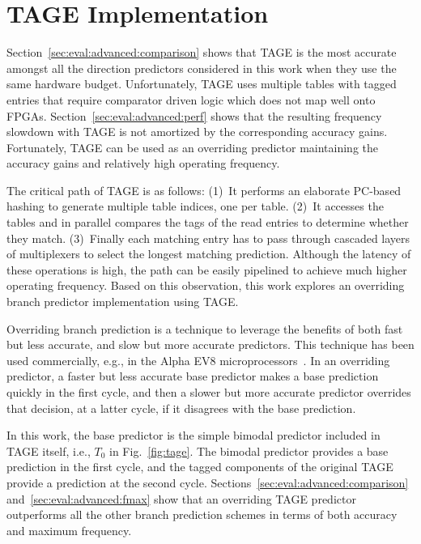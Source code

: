 \section{TAGE Implementation}
\label{sec:advanced:tage}
Section~\ref{sec:eval:advanced:comparison} shows that TAGE  is the most accurate amongst all the direction predictors considered in this work when they use the same hardware budget. Unfortunately, TAGE uses multiple tables with tagged entries that require comparator driven logic which does not map well onto FPGAs. Section~\ref{sec:eval:advanced:perf} shows that the resulting frequency slowdown with TAGE is not amortized by the corresponding accuracy gains. Fortunately, TAGE can be used as an overriding predictor maintaining the accuracy gains and relatively high operating frequency.

The critical path of TAGE is as follows: (1)~It performs an elaborate PC-based hashing to generate multiple table indices, one per table. (2)~It accesses the tables and in parallel compares the tags of the read entries to determine whether they match. (3)~Finally each matching entry has to pass through cascaded layers of multiplexers to select the longest matching prediction. Although the latency of these operations is high, the path can be easily pipelined to achieve much higher operating frequency. Based on this observation, this work explores an overriding branch predictor implementation using TAGE.

Overriding branch prediction is a technique to leverage the benefits of both fast but less accurate, and slow but more accurate predictors. This technique has been used commercially, e.g., in the Alpha EV8 microprocessors~\cite{alphaEV8}. In an overriding predictor, a faster but less accurate base predictor makes a base prediction quickly in the first cycle, and then a slower but more accurate predictor overrides that decision, at a latter cycle, if it disagrees with the base prediction. 

In this work, the base predictor is the simple bimodal predictor included in TAGE itself, i.e., $T_0$ in Fig.~\ref{fig:tage}. The bimodal predictor provides a base prediction in the first cycle, and the tagged components of the original TAGE provide a prediction at the second cycle. Sections~\ref{sec:eval:advanced:comparison} and~\ref{sec:eval:advanced:fmax} show that an overriding TAGE predictor outperforms all the other branch prediction schemes in terms of both accuracy and maximum frequency.


